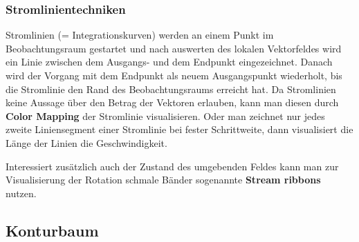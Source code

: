 \documentclass[12pt,a4paper,oneside,normalheadings,abstracton,liststotoc,bibtotoc,titlepage,pdftex]{scrbook}
\begin{document}
\subsubsection{Stromlinientechniken}
Stromlinien (= Integrationskurven) werden an einem Punkt im Beobachtungsraum gestartet und nach auswerten des lokalen Vektorfeldes wird ein Linie zwischen dem Ausgangs- und dem Endpunkt eingezeichnet. Danach wird der Vorgang mit dem Endpunkt als neuem Ausgangspunkt wiederholt, bis die Stromlinie den Rand des Beobachtungsraums erreicht hat. Da Stromlinien keine Aussage über den Betrag der Vektoren erlauben, kann man diesen durch \textbf{Color Mapping} der Stromlinie visualisieren. Oder man zeichnet nur jedes zweite Liniensegment einer Stromlinie bei fester Schrittweite, dann visualisiert die Länge  der Linien die Geschwindigkeit.

Interessiert zusätzlich auch der Zustand des umgebenden Feldes kann man zur Visualisierung der Rotation schmale Bänder sogenannte \textbf{Stream ribbons} nutzen.

\subsection{Konturbaum}
\end{document}
